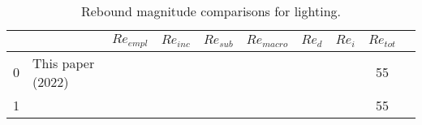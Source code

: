 
\begin{table}
\footnotesize
\begin{center}
\caption{Rebound magnitude comparisons for lighting.}
\label{tab:rebound_lighting_comparisons}
\begin{tabular}{ c l c c c c c c c c }
\toprule
 & & $Re_{empl}$ & $Re_{inc}$ & $Re_{sub}$ & $Re_{macro}$ & $Re_{d}$ & $Re_{i}$ & $Re_{tot}$ \\ 
\midrule
0 & This paper (2022) & & & & & & & 55 \\
\midrule
1 & \citet{Borenstein:2015aa} & & & & & & & 55 \\
\bottomrule
\end{tabular}
\end{center}
\end{table}
